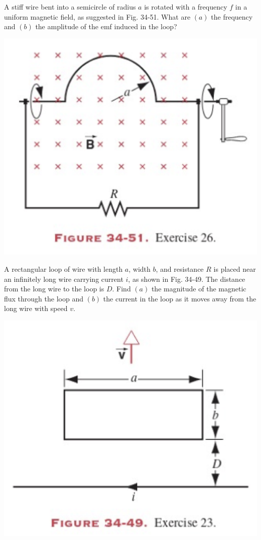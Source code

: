 \documentclass[12pt,letterpaper]{hmcpset}
\begin{document}
	\begin{problem}[34E26:]
		A stiff wire bent into a semicircle of radius $a$ is rotated with a frequency $f$ in a uniform magnetic field, as suggested in Fig. 34-51.
		What are $(a)$ the frequency and $(b)$ the amplitude of the emf induced in the loop?

		\centering\includegraphics[scale = 0.4]{Fig_34-51}
	\end{problem}
	\clearpage



	\begin{problem}[34E23:]
	A rectangular loop of wire with length $a$, width $b$, and resistance $R$ is placed near an infinitely long wire carrying current $i$, as shown in Fig. 34-49.
		The distance from the long wire to the loop is $D$.
		Find $(a)$ the magnitude of the magnetic flux through the loop and $(b)$ the current in the loop as it moves away from the long wire with speed $v$.

		\centering\includegraphics[scale = 0.3]{Fig_34-49}
	\end{problem}
	\clearpage
\end{document}
